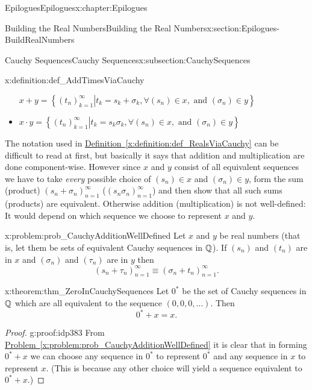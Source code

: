 \begin{chapterptx}{Epilogues}{}{Epilogues}{}{}{x:chapter:Epilogues}
\begin{sectionptx}{Building the Real Numbers}{}{Building the Real Numbers}{}{}{x:section:Epilogues-BuildRealNumbers}
\begin{subsectionptx}{Cauchy Sequences}{}{Cauchy Sequences}{}{}{x:subsection:CauchySequences}
\begin{definition}{}{x:definition:def_AddTimesViaCauchy}
\begin{itemize}[label=\textbullet]
					\(\displaystyle x+y = \left\{\left.\left(t_n\right)_{k=1}^\infty \right| t_k = s_k+\sigma_k, \forall (s_n) \in x, \text{ and } (\sigma_n)\in y\right\}\)%
					\item{}\par%
					\(\displaystyle x\cdot y = \left\{\left.\left(t_n\right)_{k=1}^\infty \right| t_k = s_k\sigma_k, \forall (s_n) \in x, \text{ and } (\sigma_n)\in y\right\}\)%
				\end{itemize}
			\end{definition}
			The notation used in \hyperref[x:definition:def_RealsViaCauchy]{Definition~{\xreffont\ref{x:definition:def_RealsViaCauchy}}} can be difficult to read at first, but basically it says that addition and multiplication are done component-wise. However since \(x\) and \(y\) consist of all equivalent sequences we have to take \emph{every} possible choice of \((s_n)\in x\) and \((\sigma_n)\in y\), form the sum (product) \((s_n+\sigma_n)_{n=1}^\infty\) (\((s_n\sigma_n)_{n=1}^\infty\)) and then show that all such sums (products) are equivalent. Otherwise addition (multiplication) is not well-defined: It would depend on which sequence we choose to represent \(x\) and \(y\).%
			\begin{problem}{}{x:problem:prob_CauchyAdditionWellDefined}%
				 Let \(x\) and \(y\) be real numbers (that is, let them be sets of equivalent Cauchy sequences  in \(\mathbb {Q}\)). If \((s_n)\) and \((t_n)\) are in \(x\) and \((\sigma_n)\) and \((\tau_n)\) are in \(y\) then%
				\begin{equation*}
					(s_n+\tau_n)_{n=1}^\infty \equiv (\sigma_n+t_n)_{n=1}^\infty\text{.}
				\end{equation*}
			\end{problem}
			\begin{theorem}{}{}{x:theorem:thm_ZeroInCauchySequences}%
				 Let \(0^*\) be the set of Cauchy sequences in \(\mathbb {Q}\) which are all equivalent to the sequence \((0, 0, 0, \ldots)\). Then%
				\begin{equation*}
					0^*+x=x\text{.}
				\end{equation*}
			\end{theorem}
			\begin{proof}{}{g:proof:idp383}
				From \hyperref[x:problem:prob_CauchyAdditionWellDefined]{Problem~{\xreffont\ref{x:problem:prob_CauchyAdditionWellDefined}}} it is clear that in forming \(0^*+x\) we can choose any sequence in \(0^*\) to represent \(0^*\) and any sequence in \(x\) to represent \(x\). (This is because any other choice will yield a sequence equivalent to \(0^*+x\).)%

\end{proof}
\end{subsectionptx}
\end{sectionptx}
\end{chapterptx}

